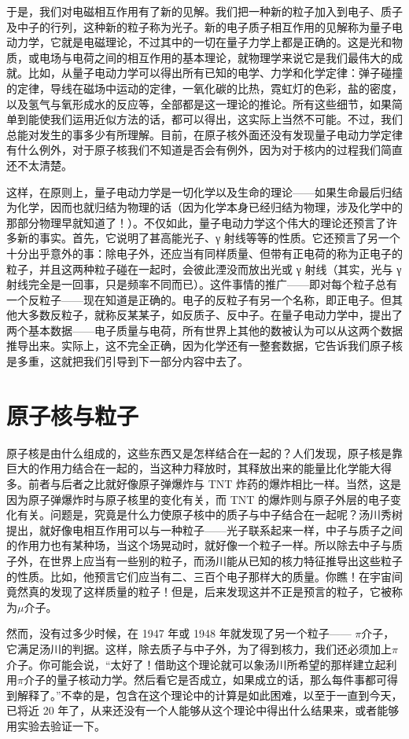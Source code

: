 \documentclass[12pt,oneside]{book}
\begin{document}
于是，我们对电磁相互作用有了新的见解。我们把一种新的粒子加入到电子、质子及中子的行列，这种新的粒子称为光子。新的电子质子相互作用的见解称为量子电动力学，它就是电磁理论，不过其中的一切在量子力学上都是正确的。这是光和物质，或电场与电荷之间的相互作用的基本理论，就物理学来说它是我们最伟大的成就。比如，从量子电动力学可以得出所有已知的电学、力学和化学定律：弹子碰撞的定律，导线在磁场中运动的定律，一氧化碳的比热，霓虹灯的色彩，盐的密度，以及氢气与氧形成水的反应等，全部都是这一理论的推论。所有这些细节，如果简单到能使我们运用近似方法的话，都可以得出，这实际上当然不可能。不过，我们总能对发生的事多少有所理解。目前，在原子核外面还没有发现量子电动力学定律有什么例外，对于原子核我们不知道是否会有例外，因为对于核内的过程我们简直还不太清楚。

这样，在原则上，量子电动力学是一切化学以及生命的理论——如果生命最后归结为化学，因而也就归结为物理的话（因为化学本身已经归结为物理，涉及化学中的那部分物理早就知道了！）。不仅如此，量子电动力学这个伟大的理论还预言了许多新的事实。首先，它说明了甚高能光子、γ 射线等等的性质。它还预言了另一个十分出乎意外的事：除电子外，还应当有同样质量、但带有正电荷的称为正电子的粒子，并且这两种粒子碰在一起时，会彼此湮没而放出光或 γ 射线（其实，光与 γ 射线完全是一回事，只是频率不同而已）。这件事情的推广——即对每个粒子总有一个反粒子——现在知道是正确的。电子的反粒子有另一个名称，即正电子。但其他大多数反粒子，就称反某某子，如反质子、反中子。在量子电动力学中，提出了两个基本数据——电子质量与电荷，所有世界上其他的数被认为可以从这两个数据推导出来。实际上，这不完全正确，因为化学还有一整套数据，它告诉我们原子核是多重，这就把我们引导到下一部分内容中去了。


\section{原子核与粒子}
原子核是由什么组成的，这些东西又是怎样结合在一起的？人们发现，原子核是靠巨大的作用力结合在一起的，当这种力释放时，其释放出来的能量比化学能大得多。前者与后者之比就好像原子弹爆炸与 TNT 炸药的爆炸相比一样。当然，这是因为原子弹爆炸时与原子核里的变化有关，而 TNT 的爆炸则与原子外层的电子变化有关。问题是，究竟是什么力使原子核中的质子与中子结合在一起呢？汤川秀树提出，就好像电相互作用可以与一种粒子——光子联系起来一样，中子与质子之间的作用力也有某种场，当这个场晃动时，就好像一个粒子一样。所以除去中子与质子外，在世界上应当有一些别的粒子，而汤川能从已知的核力特征推导出这些粒子的性质。比如，他预言它们应当有二、三百个电子那样大的质量。你瞧！在宇宙间竟然真的发现了这样质量的粒子！但是，后来发现这并不正是预言的粒子，它被称为$\mu$介子。

然而，没有过多少时候，在 1947 年或 1948 年就发现了另一个粒子—— $\pi$介子，它满足汤川的判据。这样，除去质子与中子外，为了得到核力，我们还必须加上$\pi$介子。你可能会说，“太好了！借助这个理论就可以象汤川所希望的那样建立起利用$\pi$介子的量子核动力学。然后看它是否成立，如果成立的话，那么每件事都可得到解释了。”不幸的是，包含在这个理论中的计算是如此困难，以至于一直到今天，已将近 20 年了，从来还没有一个人能够从这个理论中得出什么结果来，或者能够用实验去验证一下。
\end{document}
